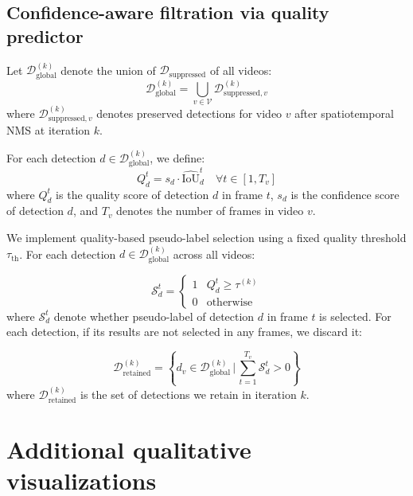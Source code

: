 \subsection{Confidence-aware filtration via quality predictor}

Let $\mathcal{D}_{\text{global}}^{(k)}$ denote the union of $\mathcal{D}_{\text{suppressed}}$ of all videos:
\begin{equation}
    \mathcal{D}_{\text{global}}^{(k)} = \bigcup_{v \in \mathcal{V}} \mathcal{D}_{\text{suppressed},v}^{(k)}
\end{equation}
where $\mathcal{D}_{\text{suppressed},v}^{(k)}$ denotes preserved detections for video $v$ after spatiotemporal NMS at iteration $k$.

For each detection $d \in \mathcal{D}_{\text{global}}^{(k)}$, we define:
\begin{equation}
    Q_d^t = s_d \cdot \hat{\text{IoU}}_d^t \quad \forall t \in [1,T_v]
\end{equation}
where $Q_d^t$ is the quality score of detection $d$ in frame $t$, $s_d$ is the confidence score of detection $d$, and $T_v$ denotes the number of frames in video $v$.

We implement quality-based pseudo-label selection using a fixed quality threshold $\tau_{\text{th}}$. For each detection $d \in \mathcal{D}_{\text{global}}^{(k)}$ across all videos:

\begin{equation}
    \mathcal{S}_d^t = \begin{cases} 
1 & Q_d^t \geq \tau^{(k)} \\
0 & \text{otherwise}
\end{cases}
\end{equation}
where $\mathcal{S}_d^t$ denote whether pseudo-label of detection $d$ in frame $t$ is selected. For each detection, if its results are not selected in any frames, we discard it:

\begin{equation}
\mathcal{D}_{\text{retained}}^{(k)} = \left\{ d_v \in \mathcal{D}_{\text{global}}^{(k)} \,\bigg|\, \sum_{t=1}^{T_v} \mathcal{S}_d^t > 0 \right\}
\end{equation}
where $\mathcal{D}_{\text{retained}}^{(k)}$ is the set of detections we retain in iteration $k$.



\section{Additional qualitative visualizations}

